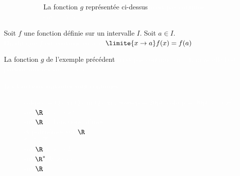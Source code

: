 \documentclass[a4paper,11pt,reqno,french,dvipsnames,table]{article}
\newcommand{\trou}[1]{\textcolor{white}{#1}}
\begin{document}
\begin{boiteExemple}[title={Exemples}]
\begin{figure}[H]
{\begin{subfigure}[b!]{.4\textwidth}
				
				La fonction $g$ représentée ci-dessus \trou{n'est pas contiune sur $[-5;5]$.}
				
			\end{subfigure}
		}
		
	\end{figure}
	
\end{boiteExemple}

\begin{boiteDefinition}[title={Définition : continuité sur un intervalle}]
	Soit $f$ une fonction définie sur un intervalle $I$. Soit $a \in I$. \\
	\trou{On dit que $f$ est continue en $a$ si $\limite{x \to a} f(x) = f(a)$.}
\end{boiteDefinition}

\begin{boiteExemple}[title={Exemple}]
	La fonction $g$ de l'exemple précédent \trou{n'est pas continue en $-1$, mais elle l'est partout ailleurs sur $[-5;5]$.}
\end{boiteExemple}

\begin{boiteProposition}[title={Propriété : Continuité des fonctions usuelles}]
	\trou{Les fonctions suivantes sont continues :}
	\begin{figure}[H]
		\centering
		\Large
		{
			\everymath{\displaystyle} %
			
			\trou{
				\begin{tblr}{
					colspec = {Q[c,m]Q[c,m]Q[c,m]},         %
					rowsep = {20pt},                     %
					colsep = {30pt}                      %
				}
					{$x \mapsto x^2$ \\ {\small sur $\R$}} & {$x \mapsto x^3$ \\ {\small sur $\R$}} & {Fonctions affines\\et polynômes {\small sur $\R$}} \\
					{$x \mapsto \sqrt x$ \\ {\small sur $\R$}} & {$x \mapsto \frac{1}{x}$ \\ {\small sur $\R^*$}} & {$x \mapsto e^x$ \\ {\small sur $\R$}}
				\end{tblr}
			}
		}
	\end{figure}
\end{boiteProposition}
\end{document}
